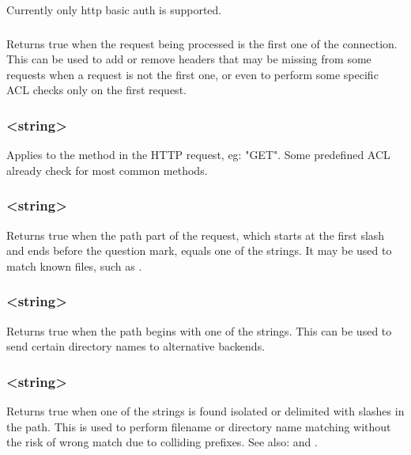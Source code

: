  Currently only http basic auth is supported.

\subsubsection[http\_first\_req]{}

  Returns true when the request being processed is the first one of the
  connection. This can be used to add or remove headers that may be missing
  from some requests when a request is not the first one, or even to perform
  some specific ACL checks only on the first request.

\subsubsection[method]{ <string>}

  Applies to the method in the HTTP request, eg: "GET". Some predefined ACL
  already check for most common methods.

\subsubsection[path]{ <string>}

  Returns true when the path part of the request, which starts at the first
  slash and ends before the question mark, equals one of the strings. It may be
  used to match known files, such as .

\subsubsection[path\_beg]{ <string>}

  Returns true when the path begins with one of the strings. This can be used
  to send certain directory names to alternative backends.

\subsubsection[path\_dir]{ <string>}

  Returns true when one of the strings is found isolated or delimited with
  slashes in the path. This is used to perform filename or directory name
  matching without the risk of wrong match due to colliding prefixes. See also:    and .

